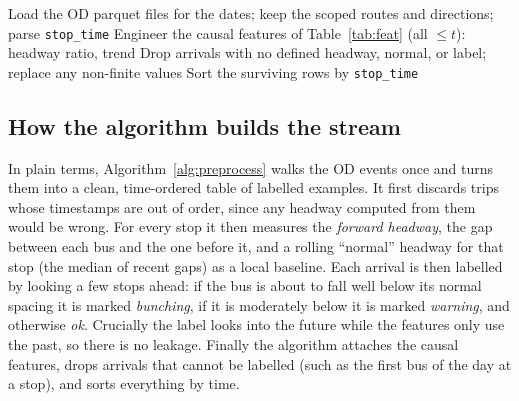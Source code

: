 \documentclass[11pt,a4paper]{article}
\begin{document}
\begin{algorithm}[H]
\footnotesize
\DontPrintSemicolon
{}
\BlankLine
Load the OD parquet files for the dates; keep the scoped routes and directions; parse \texttt{stop\_time}\;
Engineer the causal features of Table~\ref{tab:feat} (all $\le t$): headway ratio, trend\;
Drop arrivals with no defined headway, normal, or label; replace any non-finite values\;
Sort the surviving rows by \texttt{stop\_time}\;
\caption{Constructing the streaming dataset from SUNT OD.}
\label{alg:preprocess}
\end{algorithm}

\subsection{How the algorithm builds the stream}
\label{sec:build-stream}

In plain terms, Algorithm~\ref{alg:preprocess} walks the OD events once and turns them into a clean,
time-ordered table of labelled examples. It first discards trips whose timestamps are out of order,
since any headway computed from them would be wrong. For every stop it then measures the
\emph{forward headway}, the gap between each bus and the one before it, and a rolling ``normal''
headway for that stop (the median of recent gaps) as a local baseline. Each arrival is then labelled
by looking a few stops ahead: if the bus is about to fall well below its normal spacing it is marked
\emph{bunching}, if it is moderately below it is marked \emph{warning}, and otherwise \emph{ok}.
Crucially the label looks into the future while the features only use the past, so there is no
leakage. Finally the algorithm attaches the causal features, drops arrivals that cannot be labelled
(such as the first bus of the day at a stop), and sorts everything by time.
\end{document}
